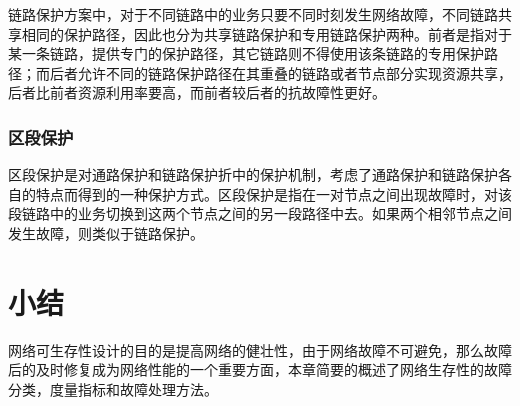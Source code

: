 链路保护方案中，对于不同链路中的业务只要不同时刻发生网络故障，不同链路共享相同的保护路径，因此也分为共享链路保护和专用链路保护两种。前者是指对于某一条链路，提供专门的保护路径，其它链路则不得使用该条链路的专用保护路径；而后者允许不同的链路保护路径在其重叠的链路或者节点部分实现资源共享，后者比前者资源利用率要高，而前者较后者的抗故障性更好。
\subsubsection{区段保护}
区段保护是对通路保护和链路保护折中的保护机制，考虑了通路保护和链路保护各自的特点而得到的一种保护方式。区段保护是指在一对节点之间出现故障时，对该段链路中的业务切换到这两个节点之间的另一段路径中去。如果两个相邻节点之间发生故障，则类似于链路保护。
\section{小结}
网络可生存性设计的目的是提高网络的健壮性，由于网络故障不可避免，那么故障后的及时修复成为网络性能的一个重要方面，本章简要的概述了网络生存性的故障分类，度量指标和故障处理方法。



